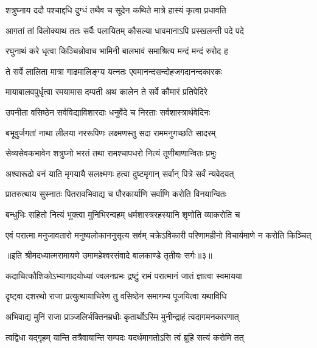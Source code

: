 \twolineshloka
{शत्रुघ्नाय ददौ पश्चाद्दधि दुग्धं तथैव च}
{सूदेन कथिते मात्रे हास्यं कृत्वा प्रधावति} %

\twolineshloka
{आगतां तां विलोक्याथ ततः सर्वैः पलायितम्}
{कौसल्या धावमानाऽपि प्रस्खलन्ती पदे पदे} %

\twolineshloka
{रघुनाथं करे धृत्वा किञ्चिन्नोवाच भामिनी}
{बालभावं समाश्रित्य मन्दं मन्दं रुरोद ह} %

\twolineshloka
{ते सर्वे लालिता मात्रा गाढमालिङ्ग्य यत्नतः}
{एवमानन्दसन्दोहजगदानन्दकारकः} %

\twolineshloka
{मायाबालवपुर्धृत्वा रमयामास दम्पती}
{अथ कालेन ते सर्वे कौमारं प्रतिपेदिरे} %

\twolineshloka
{उपनीता वसिष्ठेन सर्वविद्याविशारदाः}
{धनुर्वेदे च निरताः सर्वशास्त्रार्थवेदिनः} %

\twolineshloka
{बभूवुर्जगतां नाथा लीलया नररूपिणः}
{लक्ष्मणस्तु सदा राममनुगच्छति सादरम्} %

\twolineshloka
{सेव्यसेवकभावेन शत्रुघ्नो भरतं तथा}
{रामश्चापधरो नित्यं तूणीबाणान्वितः प्रभुः} %

\twolineshloka
{अश्वारूढो वनं याति मृगयायै सलक्ष्मणः}
{हत्वा दुष्टमृगान् सर्वान् पित्रे सर्वं न्यवेदयत्} %

\twolineshloka
{प्रातरुत्थाय सुस्नातः पितरावभिवाद्य च}
{पौरकार्याणि सर्वाणि करोति विनयान्वितः} %

\twolineshloka
{बन्धुभिः सहितो नित्यं भुक्त्वा मुनिभिरन्वहम्}
{धर्मशास्त्ररहस्यानि शृणोति व्याकरोति च} %

\twolineshloka
{एवं परात्मा मनुजावतारो मनुष्यलोकाननुसृत्य सर्वम्}
{चक्रेऽविकारी परिणामहीनो विचार्यमाणे न करोति किञ्चित्} %

{॥इति श्रीमदध्यात्मरामायणे उमामहेश्वरसंवादे
बालकाण्डे तृतीयः सर्गः॥३॥
}





\twolineshloka
{कदाचित्कौशिकोऽभ्यागादयोध्यां ज्वलनप्रभः}
{द्रष्टुं रामं परात्मानं जातं ज्ञात्वा स्वमायया} %

\twolineshloka
{दृष्ट्वा दशरथो राजा प्रत्युत्थायाचिरेण तु}
{वसिष्ठेन समागम्य पूजयित्वा यथाविधि} %

\twolineshloka
{अभिवाद्य मुनिं राजा प्राञ्जलिर्भक्तिनम्रधीः}
{कृतार्थोऽस्मि मुनीन्द्राहं त्वदागमनकारणात्} %

\twolineshloka
{त्वद्विधा यद्गृहम् यान्ति तत्रैवायान्ति सम्पदः}
{यदर्थमागतोऽसि त्वं ब्रूहि सत्यं करोमि तत्} %

